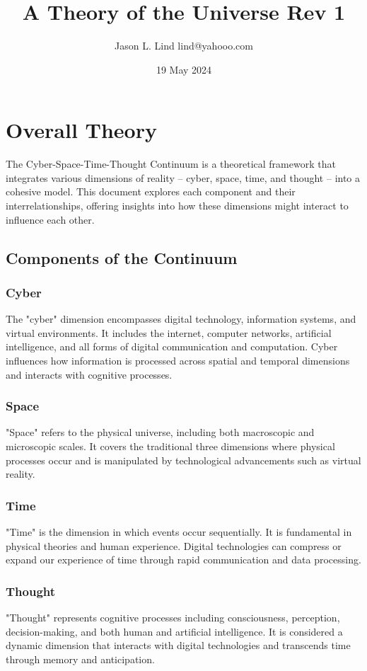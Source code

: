 \documentclass{article}
\begin{document}
\title{A Theory of the Universe Rev 1}
\author{Jason L. Lind lind@yahooo.com}
\date{19 May 2024}
\maketitle
\section*{Overall Theory}
The Cyber-Space-Time-Thought Continuum is a theoretical framework that integrates various dimensions of reality -- cyber, space, time, and thought -- into a cohesive model. This document explores each component and their interrelationships, offering insights into how these dimensions might interact to influence each other.

\subsection{Components of the Continuum}
\subsubsection{Cyber}
The "cyber" dimension encompasses digital technology, information systems, and virtual environments. It includes the internet, computer networks, artificial intelligence, and all forms of digital communication and computation. Cyber influences how information is processed across spatial and temporal dimensions and interacts with cognitive processes.

\subsubsection{Space}
"Space" refers to the physical universe, including both macroscopic and microscopic scales. It covers the traditional three dimensions where physical processes occur and is manipulated by technological advancements such as virtual reality.

\subsubsection{Time}
"Time" is the dimension in which events occur sequentially. It is fundamental in physical theories and human experience. Digital technologies can compress or expand our experience of time through rapid communication and data processing.

\subsubsection{Thought}
"Thought" represents cognitive processes including consciousness, perception, decision-making, and both human and artificial intelligence. It is considered a dynamic dimension that interacts with digital technologies and transcends time through memory and anticipation.
\end{document}
